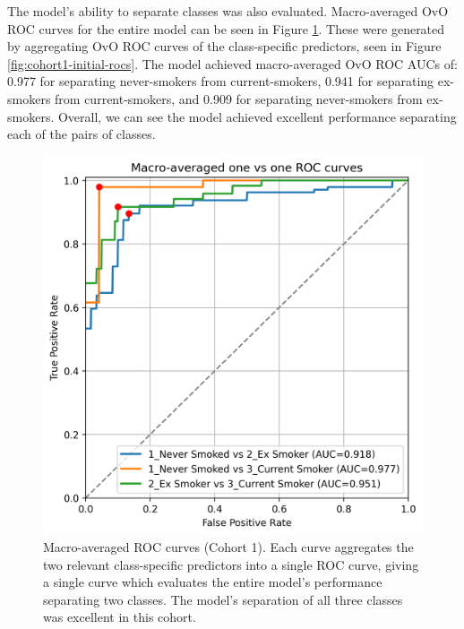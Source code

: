 \documentclass{article} %
\begin{document}
The model's ability to separate classes was also evaluated. Macro-averaged OvO ROC curves for the entire model can be seen in Figure \ref{fig:cohort1-macro-rocs}. These were generated by aggregating OvO ROC curves of the class-specific predictors, seen in Figure \ref{fig:cohort1-initial-rocs}. The model achieved macro-averaged OvO ROC AUCs of: 0.977 for separating never-smokers from current-smokers, 0.941 for separating ex-smokers from current-smokers, and 0.909 for separating never-smokers from ex-smokers. Overall, we can see the model achieved excellent performance separating each of the pairs of classes.

\begin{figure}[htb]
    \centering
    \includegraphics[width=0.9\linewidth]{cohort1/test_macro_ovo_roc.png}
    \caption[Macro-averaged ROC curves (Cohort 1)]{Macro-averaged ROC curves (Cohort 1). Each curve aggregates the two relevant class-specific predictors into a single ROC curve, giving a single curve which evaluates the entire model's performance separating two classes. The model's separation of all three classes was excellent in this cohort.}
    \label{fig:cohort1-macro-rocs}
\end{figure}
\end{document}
